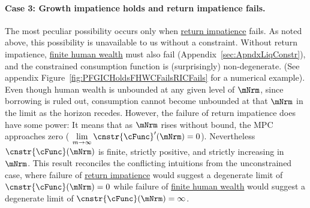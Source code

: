 \documentclass[\econtexRoot/BufferStockTheory]{subfiles}
\begin{document}
\hypertarget{RICandFHWCFail}{}
\paragraph{Case 3: Growth impatience holds and return impatience fails.} The most peculiar possibility occurs only when \hyperlink{RIC}{return impatience} fails.
As noted above, this possibility is unavailable to us without a constraint.
Without return impatience, \hyperlink{FHWC}{finite human wealth} must also fail (Appendix~\ref{sec:ApndxLiqConstr}), and the constrained consumption function is (surprisingly) non-degenerate.
(See appendix Figure~\ref{fig:PFGICHoldsFHWCFailsRICFails} for a numerical example).
Even though human wealth is unbounded at any given level of $\mNrm$, since borrowing is ruled out, consumption cannot become unbounded at that $\mNrm$ in the limit as the horizon recedes.
However, the failure of return impatience does have some power: It means that as $\mNrm$ rises without bound, the MPC approaches zero ( $\lim\limits_{m \rightarrow \infty} \cnstr{\cFunc}^{\prime}(\mNrm) = 0$).
Nevertheless $\cnstr{\cFunc}(\mNrm)$ is finite, strictly positive, and strictly increasing in $\mNrm$.
This result reconciles the conflicting intuitions from the unconstrained case, where failure of \hyperlink{RIC}{return impatience} would suggest a degenerate limit of $\cnstr{\cFunc}(\mNrm)=0$ while failure of \hyperlink{FHWC}{finite human wealth} would suggest a degenerate limit of $\cnstr{\cFunc}(\mNrm)=\infty$.




\end{document}
